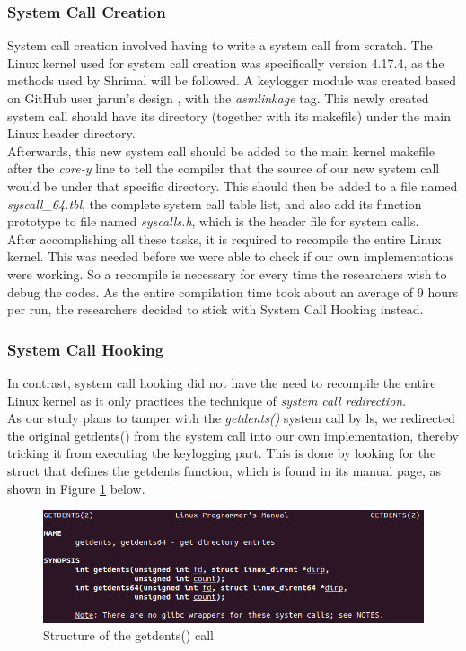 \documentclass[conference]{IEEEtran}
\newcommand\tab[1][0.5cm]{\hspace*{#1}}
\begin{document}
	\subsubsection{System Call Creation} 
	System call creation involved having to write a system call from scratch. The Linux kernel used for system call creation was specifically version 4.17.4, as the methods used by Shrimal \cite{6} will be followed. A keylogger module was created based on GitHub user jarun's design \cite{9}, with the \emph{asmlinkage} tag. This newly created system call should have its directory (together with its makefile) under the main Linux header directory. \\
	\tab Afterwards, this new system call should be added to the main kernel makefile after the \emph{core-y} line to tell the compiler that the source of our new system call would be under that specific directory. This should then be added to a file named \emph{syscall\_64.tbl}, the complete system call table list, and also add its function prototype to file named \emph{syscalls.h}, which is the header file for system calls. \\
	\tab After accomplishing all these tasks, it is required to recompile the entire Linux kernel. This was needed before we were able to check if our own implementations were working. So a recompile is necessary for every time the researchers wish to debug the codes. As the entire compilation time took about an average of 9 hours per run, the researchers decided to stick with System Call Hooking instead.
	\subsubsection{System Call Hooking}
	In contrast, system call hooking did not have the need to recompile the entire Linux kernel as it only practices the technique of \emph{system call redirection}. \\
	\tab As our study plans to tamper with the \emph{getdents()} system call by ls, we redirected the original getdents() from the system call into our own implementation, thereby tricking it from executing the keylogging part. This is done by looking for the struct that defines the getdents function, which is found in its manual page, as shown in Figure \ref{fig:man_getdents} below.
	
	\begin{figure}[H]
		\begin{centering}
			\includegraphics[width=0.8\columnwidth]{images/man_getdents.png}
			\par\end{centering}
		\caption{Structure of the getdents() call\label{fig:man_getdents}}
	\end{figure}
	
\end{document}
